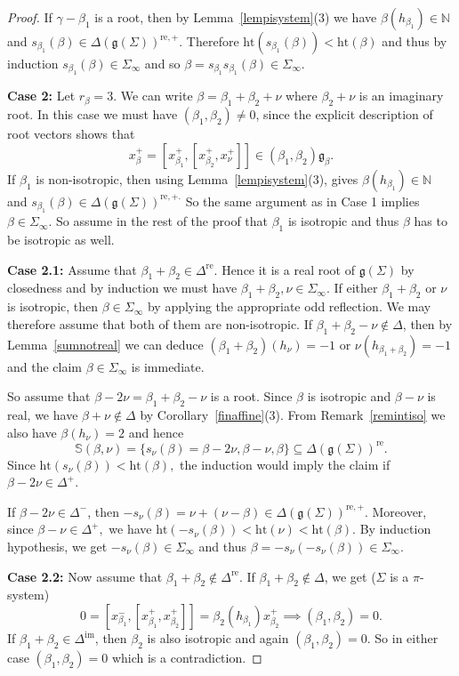 \documentclass[11pt,reqno]{amsart}
\theoremstyle{plain}
\theoremstyle{definition}
\theoremstyle{remark}
\newcommand{\lie}[1]{\mathfrak{#1}}
\newcommand\bn{\mathbb N}
\numberwithin{equation}{section}
\begin{document}
\begin{proof}
If $\gamma-\beta_{1}$ is a root, then by Lemma~\ref{lempisystem}(3) we have $\beta(h_{\beta_1})\in\bn$ and $s_{\beta_1}(\beta)\in \Delta(\lie g(\Sigma))^{\mathrm{re},+}.$ Therefore $\mathrm{ht}(s_{\beta_{1}}(\beta))<\mathrm{ht}(\beta)$ and thus by induction $s_{\beta_{1}}(\beta)\in \Sigma_\infty$ and so $\beta=s_{\beta_{1}}s_{\beta_{1}}(\beta)\in \Sigma_\infty.$

\textbf{Case 2:} Let $r_\beta=3.$ We can write $\beta=\beta_{1}+\beta_{2}+\nu$ where $\beta_{2}+\nu$ is an imaginary root. In this case we must have $(\beta_1,\beta_2)\neq 0$, since the explicit description of root vectors shows that 
$$x_{\beta}^+=[x_{\beta_1}^+,[x_{\beta_2}^+,x_{\nu}^+]]\in (\beta_1,\beta_2) \lie g_{\beta}.$$
If $\beta_{1}$ is non-isotropic, then using Lemma~\ref{lempisystem}(3), gives $\beta(h_{\beta_1})\in\bn$ and $s_{\beta_1}(\beta)\in \Delta(\lie g(\Sigma))^{\mathrm{re},+.}$ So the same argument as in Case 1 implies $\beta\in \Sigma_\infty$. So assume in the rest of the proof that $\beta_1$ is isotropic and thus $\beta$ has to be isotropic as well.

\textbf{Case 2.1:} Assume that $\beta_1+\beta_2\in \Delta^{\mathrm{re}}$. Hence it is a real root of $\lie g(\Sigma)$ by closedness and by induction we must have $\beta_1+\beta_2,\nu\in \Sigma_{\infty}$. If either $\beta_1+\beta_2$ or $\nu$ is isotropic, then $\beta \in \Sigma_\infty$ by applying the appropriate odd reflection. We may therefore assume that both of them are non-isotropic. If $\beta_1+\beta_2-\nu\notin \Delta$, then by Lemma~\ref{sumnotreal} we can deduce $(\beta_1+\beta_2)(h_{\nu})=-1$ or $\nu(h_{\beta_1+\beta_2})=-1$ and the claim $\beta\in \Sigma_{\infty}$ is immediate.

So assume that $\beta-2\nu=\beta_1+\beta_2-\nu$ is a root. Since $\beta$ is isotropic and $\beta-\nu$ is real, we have $\beta+\nu\notin \Delta$ by Corollary~\ref{finaffine}(3). From Remark~\ref{remintiso} we also have $\beta(h_{\nu})=2$ and hence
$$\mathbb{S}(\beta,\nu)=\{s_{\nu}(\beta)=\beta-2\nu,\beta-\nu,\beta\}\subseteq \Delta(\lie g(\Sigma))^{\mathrm{re}}.$$
Since $\mathrm{ht}(s_{\nu}(\beta))<\mathrm{ht}(\beta),$ the induction would imply the claim  if $\beta-2\nu\in \Delta^{+}$.

If $\beta-2\nu\in \Delta^{-}$, then $-s_\nu(\beta)=\nu+(\nu-\beta)\in \Delta(\lie g(\Sigma))^{\mathrm{re},+}$. Moreover, since $\beta-\nu\in \Delta^+,$ we have $\mathrm{ht}(-s_\nu(\beta))<\mathrm{ht}(\nu)<\mathrm{ht}(\beta).$ By induction hypothesis, we get $-s_\nu(\beta)\in \Sigma_\infty$ and thus $\beta=-s_\nu(-s_\nu(\beta))\in \Sigma_\infty.$

\textbf{Case 2.2:} Now assume that $\beta_1+\beta_2\notin \Delta^{\mathrm{re}}.$ If $\beta_1+\beta_2\notin \Delta$, we get ($\Sigma$ is a $\pi$-system)  
$$0=[x_{\beta_1}^-,[x_{\beta_1}^+,x_{\beta_2}^+]]=\beta_2(h_{\beta_1})x_{\beta_2}^+\implies (\beta_1,\beta_2)=0.$$
If $\beta_1+\beta_2\in \Delta^{\mathrm{im}}$, then $\beta_2$ is also isotropic and again $(\beta_1,\beta_2)=0$. So in either case $(\beta_1,\beta_2)=0$ which is a contradiction.
\end{proof}
\end{document}
